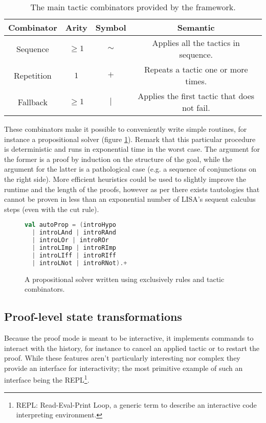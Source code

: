 \begin{table}[hbt!]
  \centering
  \begin{tabular}{||c c c c||}
  \hline
  \textbf{Combinator} & \textbf{Arity} & \textbf{Symbol} & \textbf{Semantic} \\
  \hline\hline
  Sequence & $\geq 1$ & $\sim$ & Applies all the tactics in sequence. \\ \hline
  Repetition & $1$ & $+$ & Repeats a tactic one or more times. \\ \hline
  Fallback & $\geq 1$ & $|$ & Applies the first tactic that does not fail. \\ \hline
  \end{tabular}
  \caption[Available combinators]{The main tactic combinators provided by the framework.}
  \label{tab:tactics-combinators}
\end{table}

These combinators make it possible to conveniently write simple routines, for instance a propositional solver (figure \ref{fig:solver-combinators}). Remark that this particular procedure is deterministic and runs in exponential time in the worst case. The argument for the former is a proof by induction on the structure of the goal, while the argument for the latter is a pathological case (e.g. a sequence of conjunctions on the right side). More efficient heuristics could be used to slightly improve the runtime and the length of the proofs, however as per \cite{Krajicek1994} there exists tautologies that cannot be proven in less than an exponential number of LISA's sequent calculus steps (even with the cut rule).

\begin{figure}[hbt!]
  \centering
  \begin{lstlisting}[language=Scala]
val autoProp = (introHypo
  | introLAnd | introRAnd
  | introLOr | introROr
  | introLImp | introRImp
  | introLIff | introRIff
  | introLNot | introRNot).+
  \end{lstlisting}
  \caption[Propositional solver]{A propositional solver written using exclusively rules and tactic combinators.}
  \label{fig:solver-combinators}
\end{figure}

\subsection{Proof-level state transformations}

Because the proof mode is meant to be interactive, it implements commands to interact with the history, for instance to cancel an applied tactic or to restart the proof. While these features aren't particularly interesting nor complex they provide an interface for interactivity; the most primitive example of such an interface being the REPL\footnote{REPL: Read-Eval-Print Loop, a generic term to describe an interactive code interpreting environment.}.
